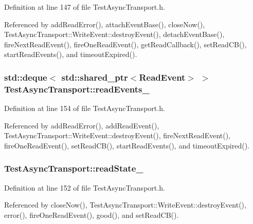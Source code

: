 Definition at line 147 of file Test\+Async\+Transport.\+h.



Referenced by add\+Read\+Error(), attach\+Event\+Base(), close\+Now(), Test\+Async\+Transport\+::\+Write\+Event\+::destroy\+Event(), detach\+Event\+Base(), fire\+Next\+Read\+Event(), fire\+One\+Read\+Event(), get\+Read\+Callback(), set\+Read\+C\+B(), start\+Read\+Events(), and timeout\+Expired().

\subsubsection[{read\+Events\+\_\+}]{\setlength{\rightskip}{0pt plus 5cm}std\+::deque$<$ std\+::shared\+\_\+ptr$<${\bf Read\+Event}$>$ $>$ Test\+Async\+Transport\+::read\+Events\+\_\+\hspace{0.3cm}{\ttfamily [private]}}\label{classTestAsyncTransport_a653392ae86c59b3f7d5c0327701ae7ab}


Definition at line 154 of file Test\+Async\+Transport.\+h.



Referenced by add\+Read\+Error(), add\+Read\+Event(), Test\+Async\+Transport\+::\+Write\+Event\+::destroy\+Event(), fire\+Next\+Read\+Event(), fire\+One\+Read\+Event(), set\+Read\+C\+B(), start\+Read\+Events(), and timeout\+Expired().

\subsubsection[{read\+State\+\_\+}]{ Test\+Async\+Transport\+::read\+State\+\_\+\hspace{0.3cm}{\ttfamily [private]}}\label{classTestAsyncTransport_a5cfbe9ecf78aa32b30c12169741d0b91}


Definition at line 152 of file Test\+Async\+Transport.\+h.



Referenced by close\+Now(), Test\+Async\+Transport\+::\+Write\+Event\+::destroy\+Event(), error(), fire\+One\+Read\+Event(), good(), and set\+Read\+C\+B().

